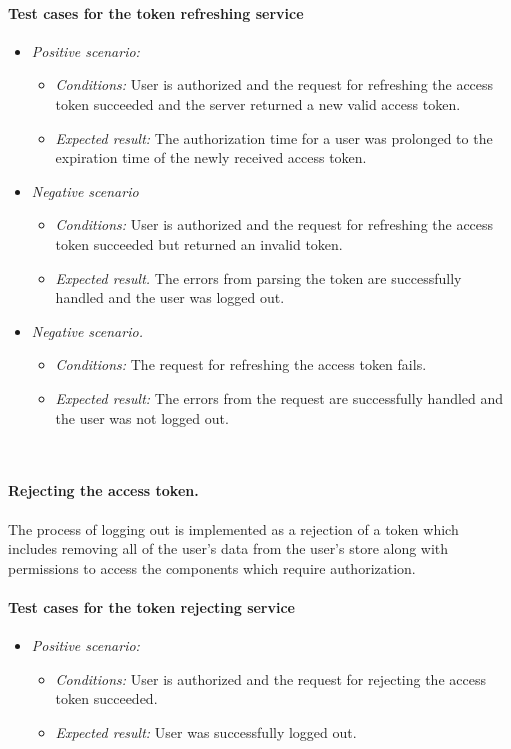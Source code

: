 \paragraph*{Test cases for the token refreshing service} 
\begin{itemize}
    \item \emph{Positive scenario:} 
        \begin{itemize}
            \item \emph{Conditions:} User is authorized and the request for refreshing the access token succeeded and the server returned a new valid access token.
            \item \emph{Expected result:} The authorization time for a user was prolonged to the expiration time of the newly received access token.
        \end{itemize}
    \item \emph{Negative scenario} 
        \begin{itemize}
            \item \emph{Conditions:} User is authorized and the request for refreshing the access token succeeded but returned an invalid token.
            \item \emph{Expected result.} The errors from parsing the token are successfully handled and the user was logged out.
        \end{itemize}
    \item \emph{Negative scenario.} 
        \begin{itemize}
            \item \emph{Conditions:} The request for refreshing the access token fails.
            \item \emph{Expected result:} The errors from the request are successfully handled and the user was not logged out.
        \end{itemize}
\end{itemize}

\


\paragraph*{Rejecting the access token.}The process of logging out is implemented as a rejection of a token which includes removing all of the user's data from the user's store along with permissions to access the components which require authorization.

\paragraph*{Test cases for the token rejecting service} 
\begin{itemize}
    \item \emph{Positive scenario:} 
        \begin{itemize}
            \item \emph{Conditions:} User is authorized and the request for rejecting the access token succeeded.
            \item \emph{Expected result:} User was successfully logged out.
        \end{itemize}
\end{itemize}

